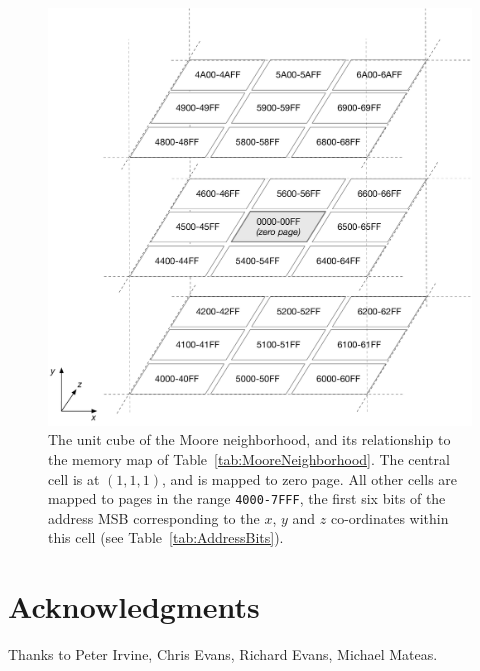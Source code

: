 \documentclass{article}
\newcommand\hex[1]{{\tt #1}}
\newcommand\hexrange[2]{\hex{#1}{\tt -}\hex{#2}}
\begin{document}
\begin{figure}
  \includegraphics[width=\textwidth]{unitcube.pdf}
\caption{
  The unit cube of the Moore neighborhood, and its relationship to the memory map of Table~\ref{tab:MooreNeighborhood}.
  The central cell is at $(1,1,1)$, and is mapped to zero page.
  All other cells are mapped to pages in the range \hexrange{4000}{7FFF},
  the first six bits of the address MSB corresponding to the $x$, $y$ and $z$ co-ordinates within this cell (see Table~\ref{tab:AddressBits}).
  \label{fig:UnitCube}
}
\end{figure}

\section*{Acknowledgments}
Thanks to Peter Irvine, Chris Evans, Richard Evans, Michael Mateas.



\end{document}
